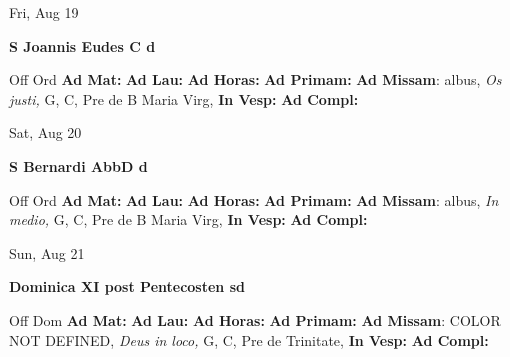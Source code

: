 \documentclass[10pt]{book}
\begin{document}
\begin{center}
\begin{minipage}{3.5in}
\vspace{2em}
\begin{center}Fri, Aug 19
\end{center}
\textbf{ \large S Joannis Eudes C
\textnormal{\normalsize d}}

\begin{justify}Off Ord
\textbf{Ad Mat: }
\textbf{Ad Lau: }
\textbf{Ad Horas: }
\textbf{Ad Primam: }\textbf{Ad Missam}: albus, \textit{Os justi,} G, C, Pre de B Maria Virg, 
\textbf{In Vesp: }
\textbf{Ad Compl: }
\end{justify}
\end{minipage}
\end{center}

\begin{center}
\begin{minipage}{3.5in}
\vspace{2em}
\begin{center}Sat, Aug 20
\end{center}
\textbf{ \large S Bernardi AbbD
\textnormal{\normalsize d}}

\begin{justify}Off Ord
\textbf{Ad Mat: }
\textbf{Ad Lau: }
\textbf{Ad Horas: }
\textbf{Ad Primam: }\textbf{Ad Missam}: albus, \textit{In medio,} G, C, Pre de B Maria Virg, 
\textbf{In Vesp: }
\textbf{Ad Compl: }
\end{justify}
\end{minipage}
\end{center}

\begin{center}
\begin{minipage}{3.5in}
\vspace{2em}
\begin{center}Sun, Aug 21
\end{center}
\textbf{ \large Dominica XI post Pentecosten
\textnormal{\normalsize sd}}

\begin{justify}Off Dom
\textbf{Ad Mat: }
\textbf{Ad Lau: }
\textbf{Ad Horas: }
\textbf{Ad Primam: }\textbf{Ad Missam}: COLOR NOT DEFINED, \textit{Deus in loco,} G, C, Pre de Trinitate, 
\textbf{In Vesp: }
\textbf{Ad Compl: }
\end{justify}
\end{minipage}
\end{center}
\end{document}
